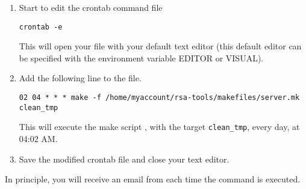 \documentclass{article}
\begin{document}
\begin{enumerate}
\item Start to edit the crontab command file

\begin{verbatim}
crontab -e
\end{verbatim}

This will open your  file with your default text editor
(this default editor can be specified with the environment variable
EDITOR or VISUAL).

\item Add the following line to the  file. 

\begin{verbatim}
02 04 * * * make -f /home/myaccount/rsa-tools/makefiles/server.mk clean_tmp
\end{verbatim}

This will execute the make script , with the target
\texttt{clean\_tmp}, every day, at 04:02 AM. 

\item Save the modified crontab file and close your text editor.

\end{enumerate}

In principle, you will receive an email from  each
time the command is executed.
\end{document}

